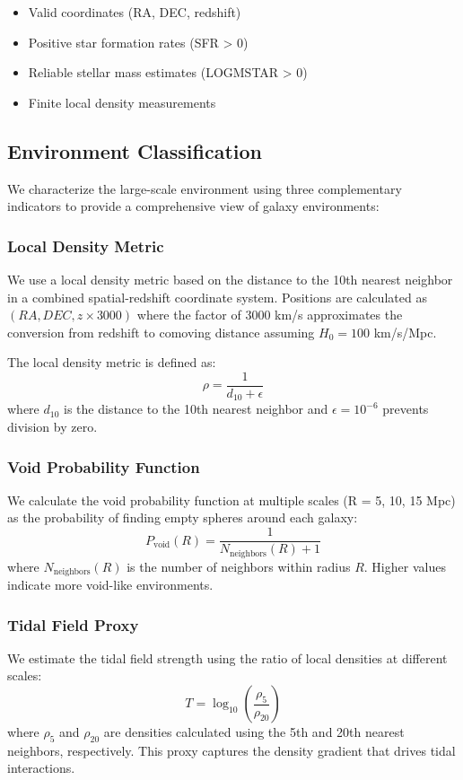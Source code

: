 \documentclass[twocolumn]{aastex701}
\begin{document}
\begin{itemize}
\item Valid coordinates (RA, DEC, redshift)
\item Positive star formation rates (SFR > 0)
\item Reliable stellar mass estimates (LOGMSTAR > 0)
\item Finite local density measurements
\end{itemize}

\subsection{Environment Classification}

We characterize the large-scale environment using three complementary indicators to provide a comprehensive view of galaxy environments:

\subsubsection{Local Density Metric}
We use a local density metric based on the distance to the 10th nearest neighbor in a combined spatial-redshift coordinate system. Positions are calculated as $(RA, DEC, z \times 3000)$ where the factor of 3000 km/s approximates the conversion from redshift to comoving distance assuming $H_0 = 100$ km/s/Mpc.

The local density metric is defined as:
\begin{equation}
\rho = \frac{1}{d_{10} + \epsilon}
\end{equation}
where $d_{10}$ is the distance to the 10th nearest neighbor and $\epsilon = 10^{-6}$ prevents division by zero.

\subsubsection{Void Probability Function}
We calculate the void probability function at multiple scales (R = 5, 10, 15 Mpc) as the probability of finding empty spheres around each galaxy:
\begin{equation}
P_{\text{void}}(R) = \frac{1}{N_{\text{neighbors}}(R) + 1}
\end{equation}
where $N_{\text{neighbors}}(R)$ is the number of neighbors within radius $R$. Higher values indicate more void-like environments.

\subsubsection{Tidal Field Proxy}
We estimate the tidal field strength using the ratio of local densities at different scales:
\begin{equation}
T = \log_{10}\left(\frac{\rho_5}{\rho_{20}}\right)
\end{equation}
where $\rho_5$ and $\rho_{20}$ are densities calculated using the 5th and 20th nearest neighbors, respectively. This proxy captures the density gradient that drives tidal interactions.
\end{document}
